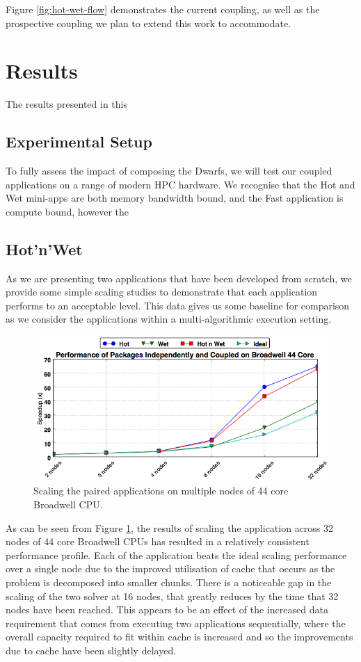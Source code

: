 \documentclass[runningheads,a4paper]{llncs}
\begin{document}
Figure \ref{fig:hot-wet-flow} demonstrates the current coupling, as well as the prospective coupling we plan to extend this work to accommodate. 

\section{Results}

The results presented in this 

\subsection{Experimental Setup}

To fully assess the impact of composing the Dwarfs, we will test our coupled applications on a range of modern HPC hardware. We recognise that the Hot and Wet mini-apps are both memory bandwidth bound, and the Fast application is compute bound, however the 

\subsection{Hot'n'Wet}

As we are presenting two applications that have been developed from scratch, we provide some simple scaling studies to demonstrate that each application performs to an acceptable level. This data gives us some baseline for comparison as we consider the applications within a multi-algorithmic execution setting.

\begin{figure}
\centering
\includegraphics[width=1.0\linewidth]{cpu_results}
\caption{Scaling the paired applications on multiple nodes of 44 core Broadwell CPU.}
\label{fig:scaling-hot-wet-broadwell}
\end{figure}

As can be seen from Figure \ref{fig:scaling-hot-wet-broadwell}, the results of scaling the application across 32 nodes of 44 core Broadwell CPUs has resulted in a relatively consistent performance profile. Each of the application beats the ideal scaling performance over a single node due to the improved utilisation of cache that occurs as the problem is decomposed into smaller chunks. There is a noticeable gap in the scaling of the two solver at 16 nodes, that greatly reduces by the time that 32 nodes have been reached. This appears to be an effect of the increased data requirement that comes from executing two applications sequentially, where the overall capacity required to fit within cache is increased and so the improvements due to cache have been slightly delayed.
\end{document}

